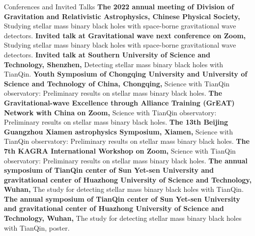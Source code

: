 
\begin{rubric}{Conferences and Invited Talks}
    \entry*[2022] \textbf{The 2022 annual meeting of Division of Gravitation and Relativistic Astrophysics, Chinese Physical Society,} Studying stellar mass binary black holes with space-borne gravitational wave detectors.
    \entry*[2022] \textbf{Invited talk at Gravitational wave next conference on Zoom,} Studying stellar mass
    binary black holes with space-borne gravitational wave detectors.
    \entry*[2022] \textbf{Invited talk at Southern University of Science and Technology, Shenzhen,} Detecting stellar mass
    binary black holes with TianQin. 
    \entry*[2021] \textbf{Youth Symposium of Chongqing University and University of Science and Technology of China,
    Chongqing,} Science with TianQin observatory: Preliminary results on stellar mass binary black holes.
    \entry*[2021] \textbf{The Gravitational-wave Excellence through Alliance Training (GrEAT) Network with China on
    Zoom,} Science with TianQin observatory: Preliminary results on stellar mass binary black holes.
    \entry*[2020] \textbf{The 13th Beijing Guangzhou Xiamen astrophysics Symposium, Xiamen,} Science with
    TianQin observatory: Preliminary results on stellar mass binary black holes.
    \entry*[2020] \textbf{The 7th KAGRA International Workshop on Zoom,} Science with
    TianQin observatory: Preliminary results on stellar mass binary black holes.
    \entry*[2019] \textbf{The annual symposium of TianQin center of Sun Yet-sen University and gravitational center of
    Huazhong University of Science and Technology,
    Wuhan,} The study for detecting stellar mass binary black holes with TianQin. 
    \entry*[2018] \textbf{The annual symposium of TianQin center of Sun Yet-sen University and gravitational center of
    Huazhong University of Science and Technology,
    Wuhan,} The study for detecting stellar mass binary black holes with TianQin, poster.
\end{rubric}
